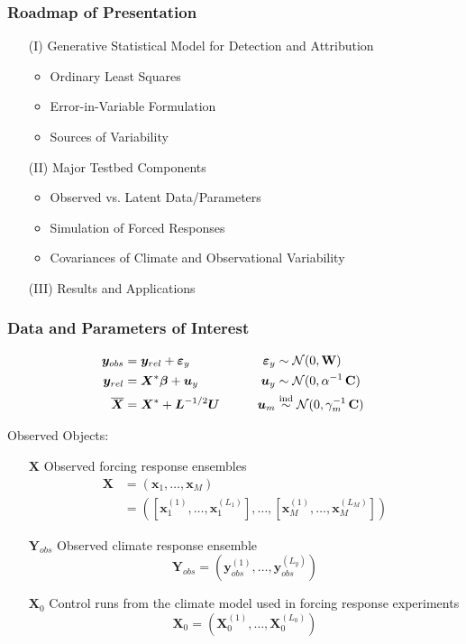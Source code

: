 \documentclass{beamer}
\newcommand{\C}{\ensuremath{\text{Cov}}}
\def\*#1{\bm{#1}}
\def\C{\textbf{\text{C}}}
\def\W{\textbf{\text{W}}}
\begin{document}
\begin{frame}
\frametitle{Roadmap of Presentation}

\begin{itemize}
\item[(I)] Generative Statistical Model for Detection and Attribution
\begin{itemize}
\item Ordinary Least Squares
\item Error-in-Variable Formulation
\item Sources of Variability
\end{itemize}
\item[(II)] \alert{Major Testbed Components}
\begin{itemize}
\item \alert{Observed vs. Latent Data/Parameters}
\item \alert{Simulation of Forced Responses}
\item \alert{Covariances of Climate and Observational Variability}
\end{itemize}
\item[(III)] Results and Applications
\end{itemize}
\end{frame}



\begin{frame}
\frametitle{Data and Parameters of Interest}

\begin{block}{}
\vspace*{-\baselineskip}\setlength\belowdisplayshortskip{0pt}
\begin{alignat*}{3}
\*y_{obs} &= \*y_{rel} + \*\varepsilon_y  \qquad \quad &\*\varepsilon_y &\sim \mathcal N(0,\W)\\
\*y_{rel} &= \*X^* \*\beta + \*u_y \nonumber  \qquad  &\*u_y &\sim \mathcal N(0,\alpha^{-1}\,\C) \\
\overline{\*X} &= \*X^* + \*L^{-1/2} \*U \qquad    &\*u_m &\stackrel{\text{ind}}{\sim} \mathcal N(0,\gamma_m^{-1} \, \C)  \:
\end{alignat*}
\end{block}

\alert{Observed Objects:}

\begin{itemize}
\item[$\*X$] Observed forcing response ensembles
\begin{align*}
\*X &= (\*x_1, \dots, \*x_M)\\
&= \left(  [\*x_1^{(1)}, \dots, \*x_1^{(L_1)} ], \dots, [\*x_M^{(1)}, \dots, \*x_M^{(L_M)} ] \right)
\end{align*}
\item[$\*Y_{obs}$] Observed climate response ensemble
\[
\*Y_{obs} = (\*y_{obs}^{(1)}, \dots, \*y_{obs}^{(L_y)})
\]
\item[$\*X_0$] Control runs from the climate model used in forcing response experiments
\[
\*X_0 = (\*X_0^{(1)}, \dots, \*X_0^{(L_0)})
\]
\end{itemize}

\end{frame}
\end{document}
